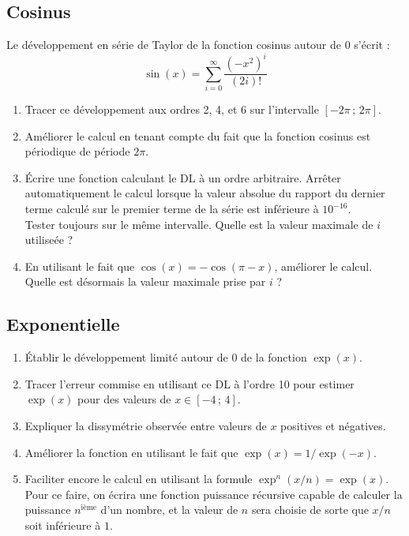 \subsection{Cosinus}
Le développement en  série de Taylor de la fonction  cosinus autour de
$0$ s'écrit :
\begin{equation}
\sin(x) = \sum_{i=0}^\infty \frac{(-x^{2})^i}{(2i)!}
\end{equation}
\begin{enumerate}
\item Tracer ce  développement aux ordres 2, 4, et  6 sur l'intervalle
  $[-2\pi\,;\,2\pi]$.
\item Améliorer  le calcul en  tenant compte  du fait que  la fonction
  cosinus est périodique de période $2\pi$.
\item  Écrire une  fonction calculant  le  DL à  un ordre  arbitraire.
  Arrêter  automatiquement  le calcul  lorsque  la  valeur absolue  du
  rapport du  dernier terme calculé sur  le premier terme de  la série
  est  inférieure   à  $10^{-16}$.\\  Tester  toujours   sur  le  même
  intervalle. Quelle est la valeur maximale de $i$ utiliseée ?
\item En utilisant le fait  que $\cos(x) = -\cos(\pi-x)$, améliorer le
  calcul. Quelle est désormais la valeur maximale prise par $i$ ?
 \end{enumerate}


\subsection{Exponentielle}
\begin{enumerate}
\item  Établir le  développement limité  autour  de 0  de la  fonction
  $\exp(x)$.
\item Tracer  l'erreur commise en  utilisant ce  DL à l'ordre  10 pour
  estimer $\exp(x)$ pour des valeurs de $x \in [-4\,;\,4]$.
\item Expliquer la dissymétrie observée entre valeurs de $x$ positives
  et négatives.
\item  Améliorer la  fonction  en  utilisant le  fait  que $\exp(x)  =
  1/\exp(-x)$.
\item Faciliter encore le calcul  en utilisant la formule $\exp^n(x/n)
  =  \exp(x)$.   Pour  ce  faire, on  écrira  une  fonction  puissance
  récursive   capable  de  calculer   la  puissance
  $n^\textrm{ième}$ d'un nombre,  et la valeur de $n$  sera choisie de
  sorte que $x/n$ soit inférieure à $1$.\\

\end{enumerate}

